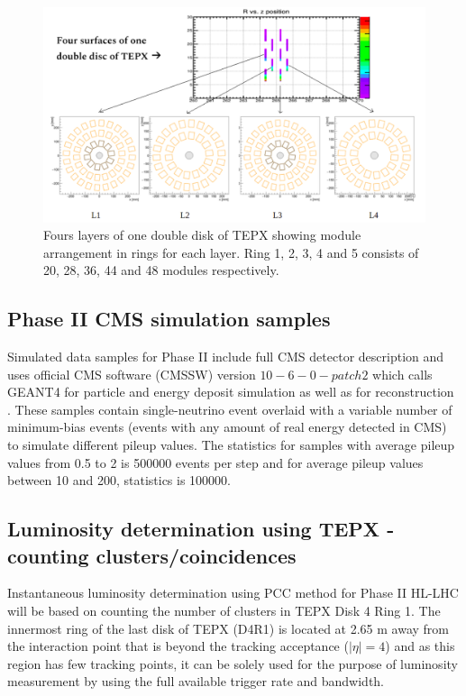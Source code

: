 \begin{figure}[H]
  \centering
  \includegraphics[width=1 \columnwidth]{./fourlayers.png}
  \caption{ \onehalfspacing Fours layers of one double disk of TEPX showing module arrangement in rings for each layer. Ring 1, 2, 3, 4 and 5 consists of 20, 28, 36, 44 and 48 modules respectively. }
  \label{fig:CMS}
\end{figure}

\subsection{Phase II CMS simulation samples}

\onelinespacing Simulated data samples for Phase II include full CMS detector description and uses official CMS software (CMSSW) version $10-6-0-patch2$ which calls GEANT4 for particle and energy deposit simulation as well as for reconstruction \cite{Agostinelli:2002hh}. These samples contain single-neutrino event overlaid with a variable number of minimum-bias events (events with any amount of real energy detected in CMS) to simulate different pileup values. The statistics for samples with average pileup values from 0.5 to 2 is 500000 events per step and for average pileup values between 10 and 200, statistics is 100000. \\

\subsection{Luminosity determination using TEPX - counting clusters/coincidences}

Instantaneous luminosity determination using PCC method for Phase II HL-LHC will be based on counting the number of clusters in TEPX Disk 4 Ring 1. The innermost ring of the last disk of TEPX (D4R1) is located at 2.65 m away from the interaction point that is beyond the tracking acceptance ($|\eta| = 4$) and as this region has few tracking points, it can be solely used for the purpose of luminosity measurement by using the full available trigger rate and bandwidth.\\

